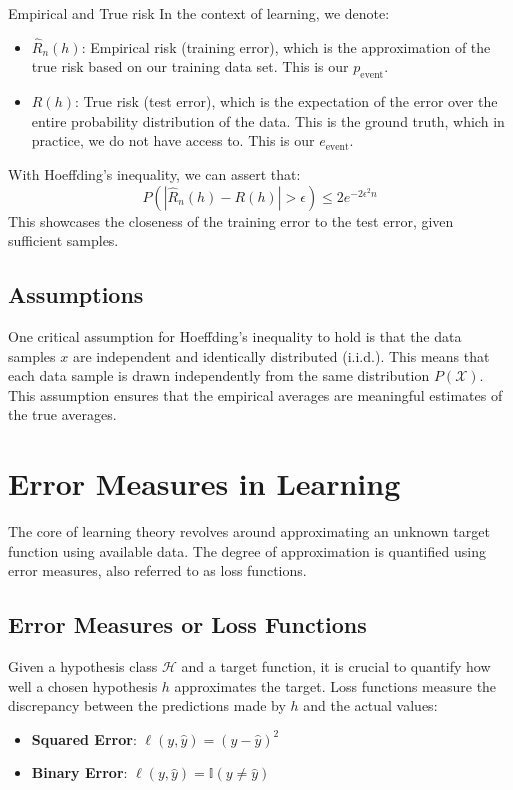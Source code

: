 \begin{definitionbox}{Empirical and True risk}
In the context of learning, we denote:
\begin{itemize}
    \item \( \widehat{R}_n(h) \): Empirical risk (training error), which is the approximation of the true risk based on our training data set. This is our $p_{\text{event}}$.
    \item \( R(h) \): True risk (test error), which is the expectation of the error over the entire probability distribution of the data. This is the ground truth, which in practice, we do not have access to. This is our $e_{\text{event}}$.
\end{itemize}
    
\end{definitionbox}
With Hoeffding's inequality, we can assert that:
$$
P(|\widehat{R}_n(h) - R(h)| > \epsilon) \leq 2e^{-2\epsilon^2n}
$$
This showcases the closeness of the training error to the test error, given sufficient samples.


\subsection{Assumptions}
One critical assumption for Hoeffding's inequality to hold is that the data samples \( x \) are independent and identically distributed (i.i.d.). This means that each data sample is drawn independently from the same distribution \( P(\mathcal{X}) \). This assumption ensures that the empirical averages are meaningful estimates of the true averages.

\section{Error Measures in Learning}

The core of learning theory revolves around approximating an unknown target function using available data. The degree of approximation is quantified using error measures, also referred to as loss functions.

\subsection{Error Measures or Loss Functions}
Given a hypothesis class \( \mathcal{H} \) and a target function, it is crucial to quantify how well a chosen hypothesis \( h \) approximates the target. Loss functions measure the discrepancy between the predictions made by \( h \) and the actual values:
\begin{itemize}
    \item \textbf{Squared Error}: \( \ell(y, \widehat{y}) = (y - \widehat{y})^2 \)
    \item \textbf{Binary Error}: \( \ell(y, \widehat{y}) = \mathbb{I}(y \neq \widehat{y}) \)
\end{itemize}


